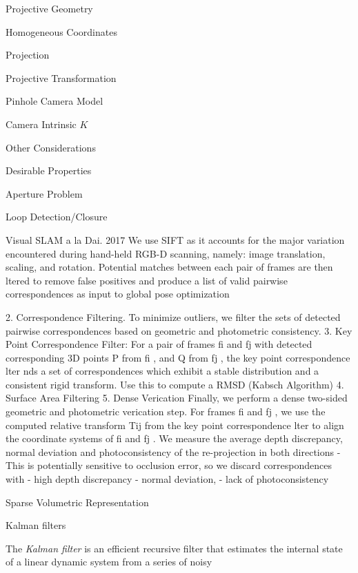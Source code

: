 \begin{section}
\begin{subsubsection}
\begin{subsubsection}
\begin{subsubsection}
\begin{section}{Projective Geometry}
\begin{subsection}{Homogeneous Coordinates}
\begin{subsubsection}
{\begin{subsubsection}{Projection}
\begin{subsubsection}{Projective Transformation}
\begin{subsection}
\begin{subsubsection}
\begin{subsubsection}
\begin{subsubsection}
{\begin{subsubsection}
\begin{subsection}
\begin{subsection} {Pinhole Camera Model}
\begin{subsection} {Camera Intrinsic $K$}
\begin{subsection}
\begin{subsection}
\begin{subsubsection}{Other Considerations}
{\begin{subsection}
\begin{subsubsection}{Desirable Properties}
\begin{section}
\begin{subsection}
\begin{subsection}
\begin{subsection}
\begin{section}
\begin{subsection}
\begin{subsubsection}
\begin{subsubsection}
\begin{subsection}
\begin{section}
\begin{subsection}
\begin{subsubsection}{Aperture Problem}
\begin{subsubsection}
{\begin{section}
\begin{subsubsection}
\begin{subsubsection}
\begin{subsubsection}
\begin{subsection}
\begin{subsection}
\begin{subsection}
\begin{subsection}
\begin{subsection}
\begin{subsection}
\begin{subsection}
\begin{subsubsection}
{\begin{subsubsection}
{\begin{subsubsection}
\begin{section}
\begin{section}
\begin{section}
\begin{subsubsection}
\begin{subsubsection}{Loop Detection/Closure}
\begin{subsubsection}{Visual SLAM a la Dai. 2017}
We use SIFT as it accounts for the major variation encountered during hand-held RGB-D scanning, namely: image translation, scaling, and rotation. Potential matches between each pair of frames are then ltered to remove false positives and produce a list of valid pairwise correspondences as input to global pose optimization

2. Correspondence Filtering. To minimize outliers, we filter the sets of detected pairwise correspondences based on geometric and photometric consistency.
3. Key Point Correspondence Filter: For a pair of frames fi and fj with detected corresponding 3D points P from fi , and Q from fj , the key point correspondence lter nds a set of correspondences which exhibit a stable distribution and a consistent rigid transform. Use this to compute a RMSD (Kabsch Algorithm)
4. Surface Area Filtering
5. Dense Verication Finally, we perform a dense two-sided geometric and photometric verication step. For frames fi and fj , we use the computed relative transform Tij from the key point correspondence lter to align the coordinate systems of fi and fj . We measure the average depth discrepancy, normal deviation and photoconsistency of the re-projection in both directions
   - This is potentially sensitive to occlusion error, so we discard correspondences with 
   - high depth discrepancy
   - normal deviation,
   - lack of photoconsistency

\begin{subsubsection}{Sparse Volumetric Representation}



\begin{subsection} Kalman filters

The \emph{Kalman filter} is an efficient recursive filter that estimates the internal state of a linear dynamic system from a series of noisy 
\end{subsection}
\end{subsubsection}
\end{subsubsection}
\end{subsubsection}
\end{subsubsection}
\end{section}
\end{section}
\end{section}
\end{subsubsection}}
\end{subsubsection}}
\end{subsubsection}
\end{subsection}
\end{subsection}
\end{subsection}
\end{subsection}
\end{subsection}
\end{subsection}
\end{subsection}
\end{subsubsection}
\end{subsubsection}
\end{subsubsection}
\end{section}}
\end{subsubsection}
\end{subsubsection}
\end{subsection}
\end{section}
\end{subsection}
\end{subsubsection}
\end{subsubsection}
\end{subsection}
\end{section}
\end{subsection}
\end{subsection}
\end{subsection}
\end{section}
\end{subsubsection}
\end{subsection}}
\end{subsubsection}
\end{subsection}
\end{subsection}
\end{subsection}
\end{subsection}
\end{subsection}
\end{subsubsection}}
\end{subsubsection}
\end{subsubsection}
\end{subsubsection}
\end{subsection}
\end{subsubsection}
\end{subsubsection}}
\end{subsubsection}
\end{subsection}
\end{section}
\end{subsubsection}
\end{subsubsection}
\end{subsubsection}
\end{section}
